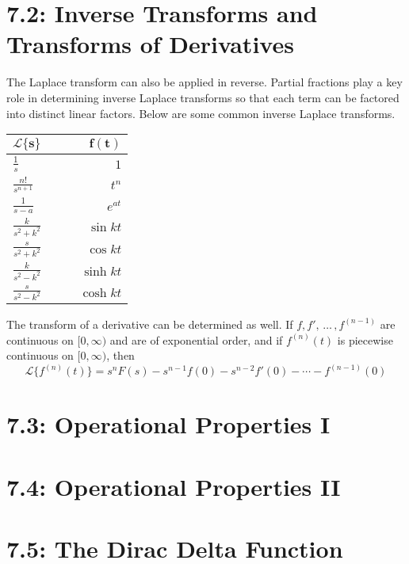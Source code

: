 \documentclass{article}
\newcommand{\lpl}{\mathscr{L}}
\begin{document}
\section*{7.2: Inverse Transforms and Transforms of Derivatives}
The Laplace transform can also be applied in reverse. Partial fractions play a key role in determining inverse Laplace transforms so that each term can be factored into distinct linear factors. Below are some common inverse Laplace transforms.
\newline
\newline
\def\arraystretch{1.5}%
\begin{tabularx}{\textwidth}{l X X r}
\toprule
\(\bm{\lpl\{s\}}\) &&& \(\bm{f(t)}\) \\
\midrule
\(\frac{1}{s}\) &&& \(1\) \\
\(\frac{n!}{s^{n+1}}\) &&& \(t^n\) \\
\(\frac{1}{s-a}\) &&& \(e^{at}\) \\
\(\frac{k}{s^2+k^2}\) &&& \(\sin kt\)\\
\(\frac{s}{s^2+k^2}\) &&& \(\cos kt\)\\
\(\frac{k}{s^2-k^2}\) &&& \(\sinh kt\)\\
\(\frac{s}{s^2-k^2}\) &&& \(\cosh kt\)\\
\bottomrule
\end{tabularx}
\newline
\newline
\newline
The transform of a derivative can be determined as well. If \(f, f',\,\hdots\,, f^{(n-1)}\) are continuous on \([0, \infty)\) and are of exponential order, and if \(f^{(n)}(t)\) is piecewise continuous on \([0,\infty)\), then
\[\lpl\{f^{(n)}(t)\}=s^nF(s)-s^{n-1}f(0)-s^{n-2}f'(0)-\cdots-f^{(n-1)}(0)\]
\section*{7.3: Operational Properties I}
\section*{7.4: Operational Properties II}
\section*{7.5: The Dirac Delta Function}
\end{document}
